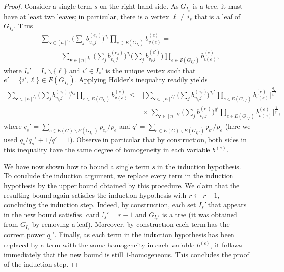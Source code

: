 \documentclass[10pt,reqno]{amsart}
\theoremstyle{definition}
\numberwithin{equation}{section}
\numberwithin{figure}{section}
\numberwithin{table}{section}
\newcommand{\card}{\mathop{\mathrm{card}}}
\begin{document}
\begin{proof}
Consider a single term $s$ on the right-hand side.
As $G_{I_s}$ is a tree, it must have at least two leaves; in
particular, there is a vertex $\ell\ne i_s$ that is a leaf of
$G_{I_s}$. Thus
\begin{align*}
        &\sum_{\mathbf{v}\in[n]^{I_s}}
	\Bigg(
	\sum_j b_{v_{i_s}j}^{(e_s)}
	\Bigg)^{q_s}
        \prod_{e\in E(G_{I_s})}b_{v(e)}^{(e)}
	= \\ &\qquad\quad
        \sum_{\mathbf{v}\in[n]^{I_s'}}
	\Bigg(
	\sum_j b_{v_{i_s}j}^{(e_s)}
	\Bigg)^{q_s}
	\Bigg(
	\sum_j b_{v_{i'}j}^{(e')}
	\Bigg)
        \prod_{e\in E(G_{I_s'})}b_{v(e)}^{(e)},
\end{align*}
where $I_s'=I_s\backslash\{\ell\}$ and $i'\in I_s'$ is the unique vertex 
such that $e'=\{i',\ell\}\in E(G_{I_s})$. Applying
H\"older's inequality readily yields
\begin{align*}
        \sum_{\mathbf{v}\in[n]^{I_s}}
	\Bigg(
	\sum_j b_{v_{i_s}j}^{(e_s)}
	\Bigg)^{q_s}
        \prod_{e\in E(G_{I_s})}b_{v(e)}^{(e)}
	\le \mbox{} & 
	\Bigg[
        \sum_{\mathbf{v}\in[n]^{I_s'}}
	\Bigg(
	\sum_j b_{v_{i_s}j}^{(e_s)}
	\Bigg)^{q_s'}
        \prod_{e\in E(G_{I_s'})}b_{v(e)}^{(e)}
	\Bigg]^{\frac{q_s}{q_s'}}
	\\
	& \times \Bigg[
        \sum_{\mathbf{v}\in[n]^{I_s'}}
	\Bigg(
	\sum_j b_{v_{i'}j}^{(e')}
	\Bigg)^{q'}
        \prod_{e\in E(G_{I_s'})}b_{v(e)}^{(e)}
	\Bigg]^{\frac{1}{q'}},
\end{align*}
where $q_s'=\sum_{e\in E(G)\backslash E(G_{I_s'})}p_{e_s}/p_e$ and
$q'=\sum_{e\in E(G)\backslash E(G_{I_s'})}p_{e'}/p_e$ (here we used 
$q_s/q_s' + 1/q' = 1$).
Observe in particular that by construction, both sides in this inequality 
have the same degree of homogeneity in each variable $b^{(e)}$.

We have now shown how to bound a single term $s$ in the induction 
hypothesis. To conclude the induction argument, we replace every term in 
the induction hypothesis by the upper bound obtained by this procedure. We 
claim that the resulting bound again satisfies the induction hypothesis 
with $r\leftarrow r-1$, concluding the induction step. Indeed, by 
construction, each set $I_s'$ that appears in the new bound satisfies 
$\card I_s'=r-1$ and $G_{I_s'}$ is a tree (it was obtained from $G_{I_s}$
by removing a leaf). Moreover, by construction each term has the correct 
power $q_s'$. Finally, as each term in the induction hypothesis has been 
replaced by a term with the same homogeneity in each variable $b^{(e)}$, 
it follows immediately that the new bound is still $1$-homogeneous. This 
concludes the proof of the induction step.


\end{proof}
\end{document}

